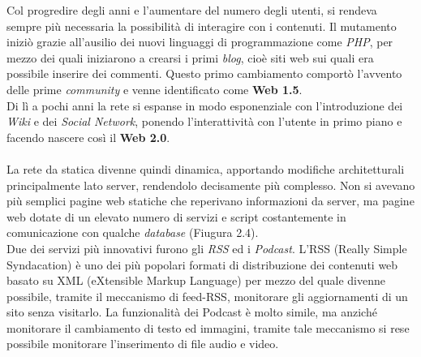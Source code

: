 \documentclass[a4paper, 11pt, oneside]{book}
\theoremstyle{plain}
\begin{document}
Col progredire degli anni e l'aumentare del numero degli utenti, si rendeva sempre più necessaria la possibilità di interagire con i contenuti. Il mutamento iniziò grazie all'ausilio dei nuovi linguaggi di programmazione come \textit{PHP}, per mezzo dei quali iniziarono a crearsi i primi \textit{blog}, cioè siti web sui quali era possibile inserire dei commenti. Questo primo cambiamento comportò l'avvento delle prime \textit{community} e venne identificato come \textbf{Web 1.5}. \\Di lì a pochi anni la rete si espanse in modo esponenziale con l'introduzione dei \textit{Wiki} e dei \textit{Social Network}, ponendo l'interattività con l'utente in primo piano e facendo nascere così il\textbf{ Web 2.0}.\\\\
La rete da statica divenne quindi dinamica, apportando modifiche architetturali principalmente lato server, rendendolo decisamente più complesso. Non si avevano più semplici pagine web statiche che reperivano informazioni da server, ma pagine web dotate di un elevato numero di servizi e script costantemente in comunicazione con qualche \textit{database} (Fiugura 2.4). \\ Due dei servizi più innovativi furono gli \textit{RSS} ed i \textit{Podcast}. L'RSS (Really Simple Syndacation) è uno dei più popolari formati di distribuzione dei contenuti web basato su XML (eXtensible Markup Language) per mezzo del quale divenne possibile, tramite il meccanismo di feed-RSS, monitorare gli aggiornamenti di un sito senza visitarlo. La funzionalità dei Podcast è molto simile, ma anziché monitorare il cambiamento di testo ed immagini, tramite tale meccanismo si rese possibile monitorare l'inserimento di file audio e video.\\
\end{document}
